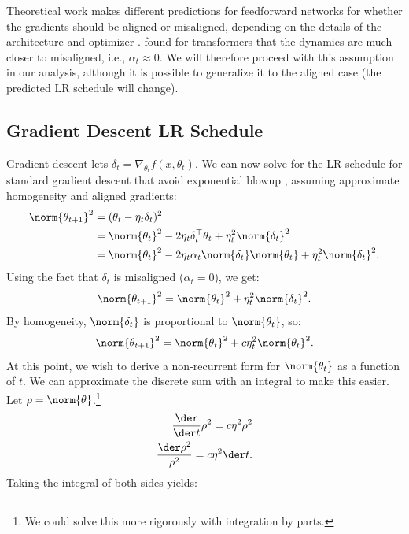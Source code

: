 Theoretical work makes different predictions for feedforward networks for whether the gradients should be aligned or misaligned, depending on the details of the architecture and optimizer \citep{li2019exponential,ji2020directional}. \citet{merrill2021effects} found for transformers that the dynamics are much closer to misaligned, i.e., $\alpha_t \approx 0$. We will therefore proceed with this assumption in our analysis, although it is possible to generalize it to the aligned case (the predicted LR schedule will change).

\subsection{Gradient Descent LR Schedule}

Gradient descent lets $\delta_t = \nabla_{\theta_t} f(x, \theta_t)$.
We can now solve for the LR schedule for standard gradient descent that avoid exponential blowup \citep[cf.][]{merrill2021effects}, assuming approximate homogeneity and aligned gradients:
\begin{align*}
    \norm{\theta_{t+1}}^2
    &= (\theta_t - \eta_t \delta_t)^2 \\
    &= \norm{\theta_t}^2 - 2 \eta_t \delta_t^\top \theta_t + \eta_t^2 \norm{\delta_t}^2 \\
    &= \norm{\theta_t}^2 - 2 \eta_t \alpha_t \norm{\delta_t} \norm{\theta_t} + \eta_t^2 \norm{\delta_t}^2 .
\end{align*}
Using the fact that $\delta_t$ is misaligned ($\alpha_t = 0$), we get:
\begin{equation*} \label{eq:norm2}
    \norm{\theta_{t+1}}^2 = \norm{\theta_t}^2 + \eta_t^2 \norm{\delta_t}^2 .
\end{equation*}
By homogeneity, $\norm{\delta_t}$ is proportional to $\norm{\theta_t}$, so:
\begin{equation*}
    \norm{\theta_{t+1}}^2 = \norm{\theta_t}^2 + c\eta_t^2 \norm{\theta_t}^2 .
\end{equation*}
At this point, we wish to derive a non-recurrent form for $\norm{\theta_{t}}$ as a function of $t$.
We can approximate the discrete sum with an integral to make this easier. Let $\rho = \norm{\theta}$.\footnote{We could solve this more rigorously with integration by parts.}
\begin{align*}
    \frac{\der}{\der t} \rho^2 = c\eta^2 \rho^2 \\
    \frac{\der \rho^2}{\rho^2} = c \eta^2 \der t .
\end{align*}
Taking the integral of both sides yields:
